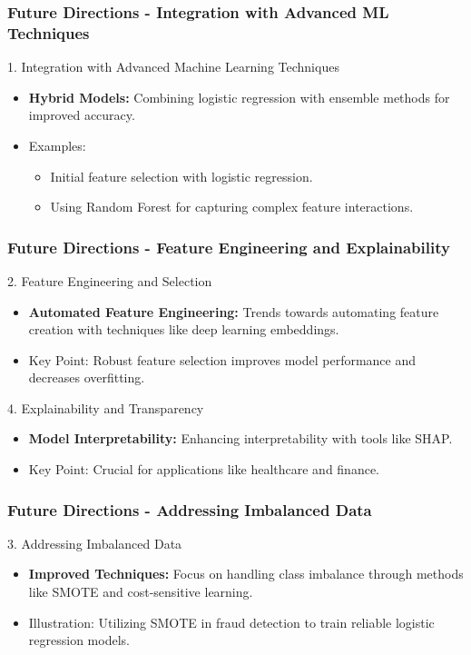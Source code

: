 \documentclass[aspectratio=169]{beamer}
\begin{document}
\begin{frame}[fragile]
    \frametitle{Future Directions - Integration with Advanced ML Techniques}
    \begin{block}{1. Integration with Advanced Machine Learning Techniques}
        \begin{itemize}
            \item \textbf{Hybrid Models:} Combining logistic regression with ensemble methods for improved accuracy.
            \item Examples: 
                \begin{itemize}
                    \item Initial feature selection with logistic regression.
                    \item Using Random Forest for capturing complex feature interactions.
                \end{itemize}
        \end{itemize}
    \end{block}
\end{frame}

\begin{frame}[fragile]
    \frametitle{Future Directions - Feature Engineering and Explainability}
    \begin{block}{2. Feature Engineering and Selection}
        \begin{itemize}
            \item \textbf{Automated Feature Engineering:} Trends towards automating feature creation with techniques like deep learning embeddings.
            \item Key Point: Robust feature selection improves model performance and decreases overfitting.
        \end{itemize}
    \end{block}
    
    \begin{block}{4. Explainability and Transparency}
        \begin{itemize}
            \item \textbf{Model Interpretability:} Enhancing interpretability with tools like SHAP.
            \item Key Point: Crucial for applications like healthcare and finance.
        \end{itemize}
    \end{block}
\end{frame}

\begin{frame}[fragile]
    \frametitle{Future Directions - Addressing Imbalanced Data}
    \begin{block}{3. Addressing Imbalanced Data}
        \begin{itemize}
            \item \textbf{Improved Techniques:} Focus on handling class imbalance through methods like SMOTE and cost-sensitive learning.
            \item Illustration: Utilizing SMOTE in fraud detection to train reliable logistic regression models.
        \end{itemize}
    \end{block}
\end{frame}
\end{document}
